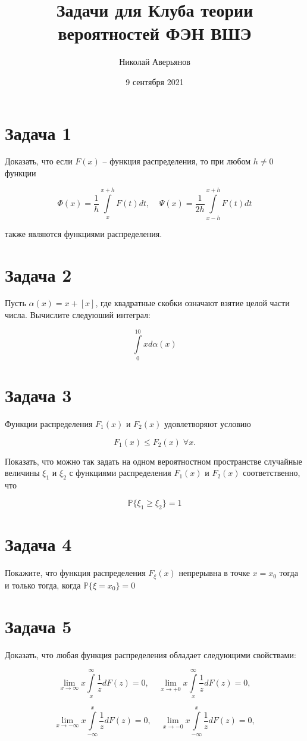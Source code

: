 \documentclass[a4paper, 12pt]{article}
\title{Задачи для Клуба теории вероятностей ФЭН ВШЭ}
\author{Николай Аверьянов}
\date{9 сентября 2021}
\renewcommand{\P}{\mathbb{P}}
\begin{document}
\maketitle

\section*{Задача 1}
Доказать, что если $F(x)$ -- функция распределения, то при любом $h \neq 0$ функции

$$
\Phi(x) = \frac{1}{h} \int \limits_{x}^{x+h} F(t) dt, \;\;\;\; \Psi(x) = \frac{1}{2h} \int \limits_{x-h}^{x+h} F(t)dt
$$

также являются функциями распределения.

\section*{Задача 2}
Пусть $\alpha(x) = x + [x]$, где квадратные скобки означают взятие целой части числа. Вычислите следуюший интеграл:

$$
\int \limits_0^{10} x d\alpha(x)
$$

\section*{Задача 3} 
Функции распределения $F_1(x)$ и $F_2(x)$ удовлетворяют условию 

$$
F_1(x) \leq F_2(x) \; \forall x.
$$

Показать, что можно так задать на одном вероятностном пространстве случайные величины $\xi_1$ и $\xi_2$ с функциями распределения $F_1(x)$ и $F_2(x)$ соответственно, что

$$
\P \{\xi_1 \geq \xi_2\} = 1
$$

\section*{Задача 4}
Покажите, что функция распределения $F_{\xi}(x)$ непрерывна в точке $x=x_0$ тогда и только тогда, когда $\P\{\xi = x_0\} = 0$


\section*{Задача 5}
Доказать, что любая функция распределения обладает следующими свойствами:

$$
\lim_{x \to \infty} x \int \limits_{x}^{\infty} \frac{1}{z} dF(z) = 0, \;\;\;\; \lim_{x \to +0} x  \int \limits_{x}^{\infty} \frac{1}{z} dF(z) = 0, 
$$

$$
\lim_{x \to -\infty} x \int \limits_{-\infty}^{x} \frac{1}{z} dF(z) = 0, \;\;\;\; \lim_{x \to -0} x  \int \limits_{-\infty}^{x} \frac{1}{z} dF(z) = 0, 
$$
\end{document}
